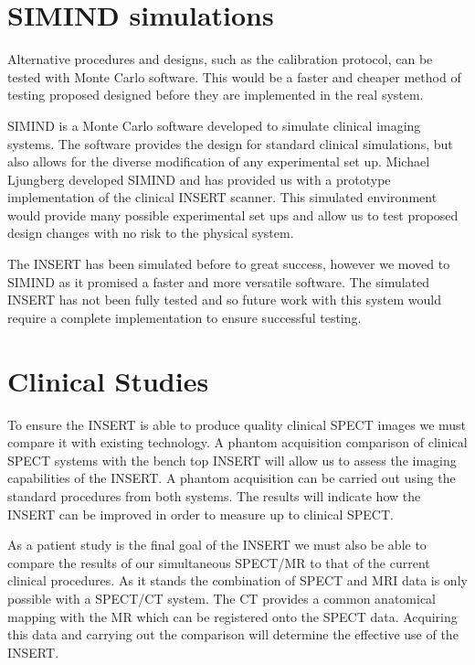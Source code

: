 \section{SIMIND simulations}
Alternative procedures and designs, such as the calibration protocol, can be tested with Monte Carlo software. This would be a faster and cheaper method of testing proposed designed before they are implemented in the real system. 

SIMIND is a Monte Carlo software developed to simulate clinical imaging systems. The software provides the design for standard clinical simulations, but also allows for the diverse modification of any experimental set up. Michael Ljungberg developed SIMIND and has provided us with a prototype implementation of the clinical \acrshort{INSERT} scanner. This simulated environment would provide many possible experimental set ups and allow us to test proposed design changes with no risk to the physical system. 

The \acrshort{INSERT} has been simulated before to great success, however we moved to SIMIND as it promised a faster and more versatile software. The simulated \acrshort{INSERT} has not been fully tested and so future work with this system would require a complete implementation to ensure successful testing. 

\section{Clinical Studies}
To ensure the \acrshort{INSERT} is able to produce quality clinical \acrshort{SPECT} images we must compare it with existing technology. A phantom acquisition comparison of clinical \acrshort{SPECT} systems with the bench top \acrshort{INSERT} will allow us to assess the imaging capabilities of the INSERT. A phantom acquisition can be carried out using the standard procedures from both systems. The results will indicate how the \acrshort{INSERT} can be improved in order to measure up to clinical \acrshort{SPECT}.

As a patient study is the final goal of the \acrshort{INSERT} we must also be able to compare the results of our simultaneous \acrshort{SPECT/MR} to that of the current clinical procedures. As it stands the combination of \acrshort{SPECT} and \acrshort{MRI} data is only possible with a \acrshort{SPECT/CT} system. The \acrshort{CT} provides a common anatomical mapping with the \acrshort{MR} which can be registered onto the \acrshort{SPECT} data. Acquiring this data and carrying out the comparison will determine the effective use of the \acrshort{INSERT}. 

